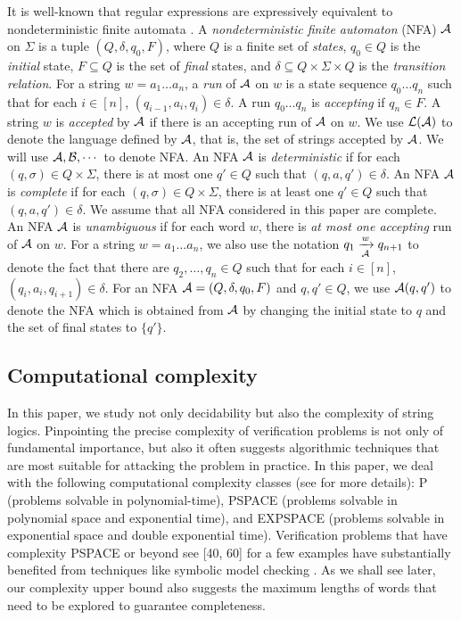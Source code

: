 It is well-known that regular expressions are expressively equivalent to nondeterministic finite automata \cite{}. 
A \emph{nondeterministic finite automaton} (NFA) $\mathcal{A}$ on $\Sigma$ is a tuple $(Q, \delta, q_0, F)$, where $Q$ is a finite set of \emph{states}, $q_0 \in Q$ is the \emph{initial} state, $F \subseteq Q$ is the set of \emph{final} states, and $\delta \subseteq Q \times \Sigma \times Q$ is the \emph{transition relation}. For a string $w = a_1 \dots a_n$, a \emph{run} of $\mathcal{A}$ on $w$ is a state sequence $q_0 \dots q_n$ such that for each $i \in [n]$, $(q_{i-1}, a_i, q_i) \in \delta$. A run $q_0 \dots q_n$ is \emph{accepting} if $q_n \in F$. A string $w$ is \emph{accepted} by $\mathcal{A}$ if there is an accepting run of $\mathcal{A}$ on $w$. We use $\mathcal{L}(\mathcal{A})$ to denote the language defined by $\mathcal{A}$, that is, the set of strings accepted by $\mathcal{A}$. We will use $\mathcal{A}, \mathcal{B}, \cdots$ to denote NFA. An NFA $\mathcal{A}$ is \emph{deterministic} if for each $(q, \sigma) \in Q \times \Sigma$, there is at most one $q' \in Q$ such that $(q, a, q') \in \delta$. An NFA $\mathcal{A}$ is \emph{complete} if for each $(q, \sigma) \in Q \times \Sigma$, there is at least one $q' \in Q$ such that $(q, a, q') \in \delta$. We assume that all NFA considered in this paper are complete.  An NFA $\mathcal{A}$ is \emph{unambiguous} if for each word $w$, there is \emph{at most one accepting} run of $\mathcal{A}$ on $w$.
For a string $w= a_1 \dots a_n$, we also use the notation $q_1 \xrightarrow[\mathcal{A}]{w} q_{n+1}$ to denote the fact that there are $q_2,\dots, q_n \in Q$ such that for each $i \in [n]$, $(q_i, a_i, q_{i+1}) \in \delta$.  For an NFA $\mathcal{A}=(Q, \delta, q_0, F)$ and $q, q' \in Q$, we use $\mathcal{A}(q,q')$ to denote the NFA which is obtained from $\mathcal{A}$ by changing the initial state to $q$ and the set of final states to $\{q'\}$.


\subsection*{Computational complexity}
In this paper, we study not only decidability but also the complexity of string logics. Pinpointing the
precise complexity of verification problems is not only of fundamental
importance, but also it often suggests algorithmic techniques
that are most suitable for attacking the problem in practice.
In this paper, we deal with the following computational complexity
classes (see \cite{} for more details): P (problems solvable
in polynomial-time), PSPACE (problems solvable in polynomial
space and exponential time), and EXPSPACE (problems solvable
in exponential space and double exponential time). Verification
problems that have complexity PSPACE or beyond see [40, 60]
for a few examples have substantially benefited from techniques
like symbolic model checking \cite{}. As we shall see later, our complexity
upper bound also suggests the maximum lengths of words
that need to be explored to guarantee completeness.

